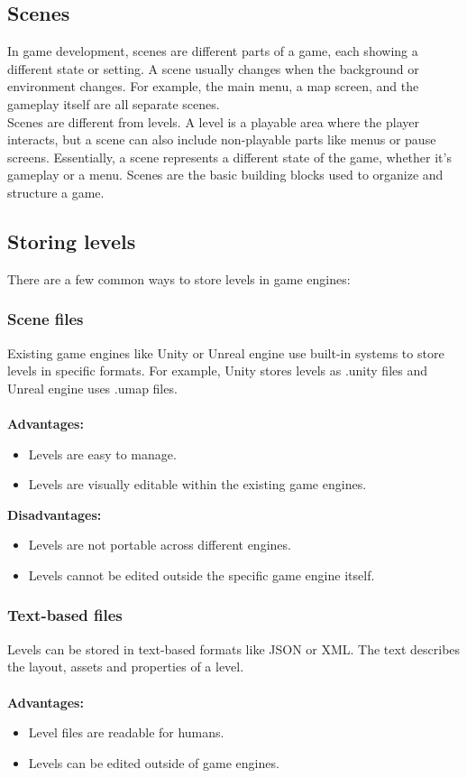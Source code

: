 \subsection{Scenes}
In game development, scenes are different parts of a game, each showing a different state or setting.
A scene usually changes when the background or environment changes.
For example, the main menu, a map screen, and the gameplay itself are all separate scenes.
\\
Scenes are different from levels.
A level is a playable area where the player interacts, but a scene can also include non-playable parts like menus or pause screens.
Essentially, a scene represents a different state of the game, whether it’s gameplay or a menu.
Scenes are the basic building blocks used to organize and structure a game.


\subsection{Storing levels}
There are a few common ways to store levels in game engines:
\subsubsection {Scene files}
Existing game engines like Unity or Unreal engine use built-in systems to store levels in specific formats.
For example, Unity stores levels as .unity files and Unreal engine uses .umap files.
\\\\
\textbf{Advantages:}
\begin{itemize}
    \item Levels are easy to manage.
    \item Levels are visually editable within the existing game engines.
\end{itemize}

\noindent\textbf{Disadvantages:}
\begin{itemize}
    \item Levels are not portable across different engines.
    \item Levels cannot be edited outside the specific game engine itself.
\end{itemize}

\subsubsection{Text-based files}
Levels can be stored in text-based formats like JSON or XML.
The text describes the layout, assets and properties of a level.
\\\\
\textbf{Advantages:}
\begin{itemize}
    \item Level files are readable for humans.
    \item Levels can be edited outside of game engines.
\end{itemize}

